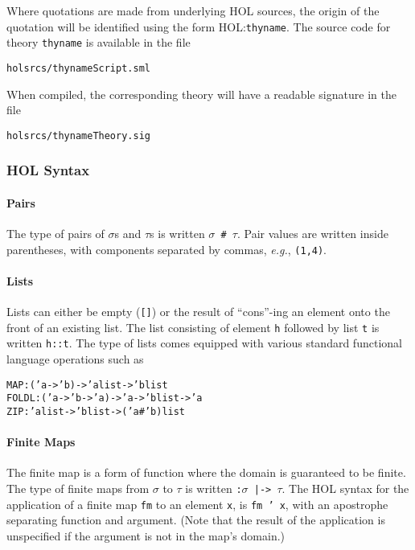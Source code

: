 \documentclass[11pt]{article}
\newcommand{\eg}{\emph{e.g.}}
\newcommand{\HOLfile}[1]{HOL:\texttt{#1}}
\begin{document}
Where quotations are made from underlying HOL sources, the origin of
the quotation will be identified using the form \HOLfile{thyname}.
The source code for theory \texttt{thyname} is available in the file 
\begin{alltt}
   holsrcs/thynameScript.sml
\end{alltt}
When compiled, the corresponding theory will have a readable
signature in the file
\begin{alltt}
   holsrcs/thynameTheory.sig
\end{alltt}

\subsubsection{HOL Syntax}

\paragraph{Pairs} The type of pairs of $\sigma$s and $\tau$s is
written \texttt{$\sigma$~\#~$\tau$}.  Pair values are written inside
parentheses, with components separated by commas, \eg,
\texttt{(1,4)}. 

\paragraph{Lists} Lists can either be empty (\texttt{[]}) or the
result of ``cons''-ing an element onto the front of an
existing list.  The list consisting of element \texttt{h} followed by
list \texttt{t} is written \texttt{h::t}. The type of lists comes
equipped with various standard functional language operations such as 
\begin{alltt}
   MAP   : ('a -> 'b) -> 'a list -> 'b list
   FOLDL : ('a -> 'b -> 'a) -> 'a -> 'b list -> 'a
   ZIP   : 'a list -> 'b list -> ('a # 'b) list
\end{alltt}

\paragraph{Finite Maps} The finite map is a form of function where the
domain is guaranteed to be finite.  The type of finite maps from
$\sigma$ to $\tau$ is written \texttt{:$\sigma$~|->~$\tau$}.  The HOL
syntax for the application of a finite map \texttt{fm} to an element
\texttt{x}, is \texttt{fm~'~x}, with an apostrophe separating
function and argument.  (Note that the result of the application is
unspecified if the argument is not in the map's domain.)
\end{document}

